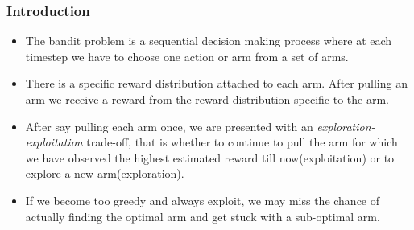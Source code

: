 \begin{frame}
\frametitle{Introduction}
\begin{itemize}
\item<1-> The bandit problem is a sequential decision making process where at each timestep we have to choose one action or arm from a set of arms.
\item<2-> There is a specific reward distribution attached to each arm.  After pulling an arm we receive a reward from the reward distribution specific to the arm. 
\item<3-> After say pulling each arm once, we are presented with an \emph{exploration-exploitation}  trade-off, that is whether to continue to pull the arm for which we have observed the highest estimated reward till now(exploitation) or to explore a new arm(exploration). 
\item<4-> If we become too greedy and always exploit, we may miss the chance of actually finding the optimal arm and get stuck with a sub-optimal arm.
\end{itemize}
\end{frame}


